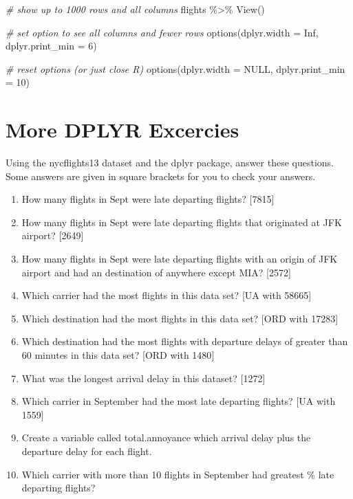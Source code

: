 \documentclass[
]{book}
\newenvironment{Shaded}{\begin{snugshade}}{\end{snugshade}}
\newcommand{\AttributeTok}[1]{\textcolor[rgb]{0.77,0.63,0.00}{#1}}
\newcommand{\CommentTok}[1]{\textcolor[rgb]{0.56,0.35,0.01}{\textit{#1}}}
\newcommand{\ConstantTok}[1]{\textcolor[rgb]{0.00,0.00,0.00}{#1}}
\newcommand{\DecValTok}[1]{\textcolor[rgb]{0.00,0.00,0.81}{#1}}
\newcommand{\FunctionTok}[1]{\textcolor[rgb]{0.00,0.00,0.00}{#1}}
\newcommand{\NormalTok}[1]{#1}
\newcommand{\SpecialCharTok}[1]{\textcolor[rgb]{0.00,0.00,0.00}{#1}}
\providecommand{\tightlist}{%
  \setlength{\itemsep}{0pt}\setlength{\parskip}{0pt}}
\begin{document}
\begin{Shaded}
\begin{Highlighting}[]
\CommentTok{\# show up to 1000 rows and all columns}
\NormalTok{flights }\SpecialCharTok{\%\textgreater{}\%} \FunctionTok{View}\NormalTok{()}

\CommentTok{\# set option to see all columns and fewer rows}
\FunctionTok{options}\NormalTok{(}\AttributeTok{dplyr.width =} \ConstantTok{Inf}\NormalTok{, }\AttributeTok{dplyr.print\_min =} \DecValTok{6}\NormalTok{)}

\CommentTok{\# reset options (or just close R)}
\FunctionTok{options}\NormalTok{(}\AttributeTok{dplyr.width =} \ConstantTok{NULL}\NormalTok{, }\AttributeTok{dplyr.print\_min =} \DecValTok{10}\NormalTok{)}
\end{Highlighting}
\end{Shaded}

\hypertarget{more-dplyr-excercies}{%
\chapter{More DPLYR Excercies}\label{more-dplyr-excercies}}

Using the nycflights13 dataset and the dplyr package, answer these questions. Some answers are given in square brackets for you to check your answers.

\begin{enumerate}
\def\labelenumi{\arabic{enumi}.}
\tightlist
\item
  How many flights in Sept were late departing flights? {[}7815{]}
\item
  How many flights in Sept were late departing flights that originated at JFK airport? {[}2649{]}
\item
  How many flights in Sept were late departing flights with an origin of JFK airport and had an destination of anywhere except MIA? {[}2572{]}
\item
  Which carrier had the most flights in this data set? {[}UA with 58665{]}
\item
  Which destination had the most flights in this data set? {[}ORD with 17283{]}
\item
  Which destination had the most flights with departure delays of greater than 60 minutes in this data set? {[}ORD with 1480{]}
\item
  What was the longest arrival delay in this dataset? {[}1272{]}
\item
  Which carrier in September had the most late departing flights? {[}UA with 1559{]}
\item
  Create a variable called total.annoyance which arrival delay plus the departure delay for each flight.
\item
  Which carrier with more than 10 flights in September had greatest \% late departing flights?
\end{enumerate}
\end{document}
